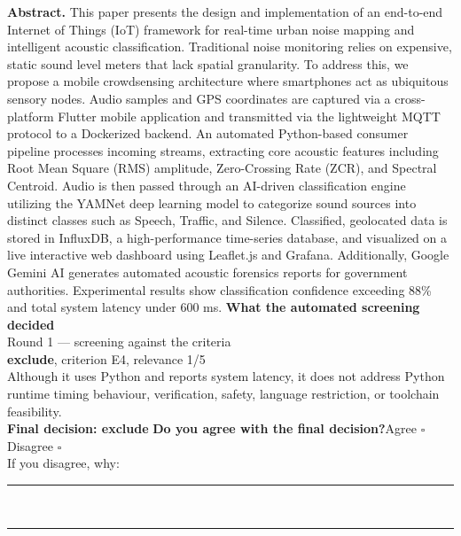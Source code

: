 \documentclass[11pt,a4paper]{article}
\begin{document}
{\small\textbf{Abstract.} This paper presents the design and implementation of an end-to-end Internet of Things (IoT) framework for real-time urban noise mapping and intelligent acoustic classification. Traditional noise monitoring relies on expensive, static sound level meters that lack spatial granularity. To address this, we propose a mobile crowdsensing architecture where smartphones act as ubiquitous sensory nodes. Audio samples and GPS coordinates are captured via a cross-platform Flutter mobile application and transmitted via the lightweight MQTT protocol to a Dockerized backend. An automated Python-based consumer pipeline processes incoming streams, extracting core acoustic features including Root Mean Square (RMS) amplitude, Zero-Crossing Rate (ZCR), and Spectral Centroid. Audio is then passed through an AI-driven classification engine utilizing the YAMNet deep learning model to categorize sound sources into distinct classes such as Speech, Traffic, and Silence. Classified, geolocated data is stored in InfluxDB, a high-performance time-series database, and visualized on a live interactive web dashboard using Leaflet.js and Grafana. Additionally, Google Gemini AI generates automated acoustic forensics reports for government authorities. Experimental results show classification confidence exceeding 88\% and total system latency under 600 ms.}
\vspace{3mm}
\vspace{2.5mm}
{\small\textbf{What the automated screening decided}}\\[2mm]
{\footnotesize\color{soft}Round 1 --- screening against the criteria}\\[0.5mm]
{\small\textbf{exclude}, criterion E4, relevance 1/5}\\[0.5mm]
{\small Although it uses Python and reports system latency, it does not address Python runtime timing behaviour, verification, safety, language restriction, or toolchain feasibility.}\\[2.5mm]
{\small\textbf{Final decision: exclude}}
\vspace{2mm}
{\small\textbf{Do you agree with the final decision?}\quad{}Agree $\square$\qquad{}Disagree $\square$}\\[1mm]
{\footnotesize\color{soft}If you disagree, why:}\\[1mm]
\color{rule}\rule{\linewidth}{0.3pt}\\[3mm]\rule{\linewidth}{0.3pt}\color{black}
\end{document}
